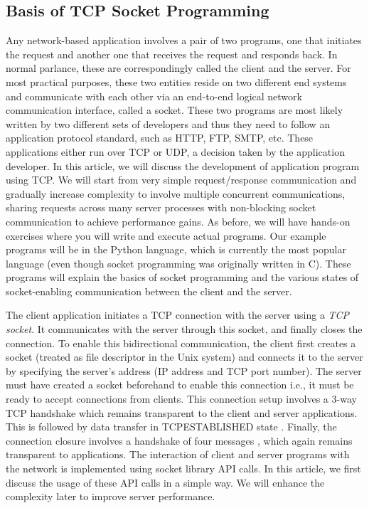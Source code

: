 \begin{multicols}{2}
\section{Basis of TCP Socket Programming}

Any network-based application involves a pair of two programs, one that initiates the request and another one that receives the request and responds back. In normal parlance, these are correspondingly called the client and the server. For most practical purposes, these two entities reside on two different end systems and communicate with each other via an end-to-end logical network communication interface, called a socket. These two programs are most likely written by two different sets of developers and thus they need to follow an application protocol standard, such as HTTP, FTP, SMTP, etc.  These applications either run over TCP or UDP, a decision taken by the application developer. In this article, we will discuss the development of application program using TCP. We will start from very simple request/response communication and gradually increase complexity to involve multiple concurrent communications, sharing requests across many server processes with non-blocking socket communication to achieve performance gains. As before, we will have hands-on exercises where you will write and execute actual programs. Our example programs will be in the Python language, which is currently the most popular language (even though socket programming was originally written in C). These programs will explain the basics of socket programming and the various states of socket-enabling communication between the client and the server.

The client application initiates a TCP connection with the server using a \textit{TCP socket}. It communicates with the server through this socket, and finally closes the connection. To enable this bidirectional communication, the client first creates a socket (treated as file descriptor in the Unix system) and connects it to the server by specifying the server’s address (IP address and TCP port number). The server must have created a socket beforehand to enable this connection i.e., it must be ready to accept connections from clients. This connection setup involves a 3-way TCP handshake \cite{art1-key09}\cite{art1-key10}\cite{art1-key11} which remains transparent to the client and server applications. This is followed by data transfer in TCP\break ESTABLISHED state \cite{art1-key11}. Finally, the connection closure involves a handshake of four messages \cite{art1-key12}, which again remains transparent to applications. The interaction of client and server programs with the network is implemented using socket library API calls. In this article, we first discuss the usage of these API calls in a simple way. We will enhance the complexity later to improve server performance.


\end{multicols}
